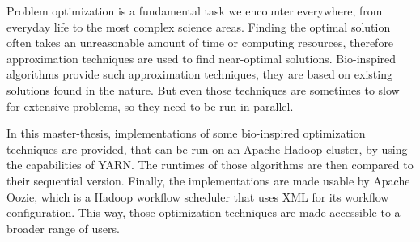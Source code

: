 Problem optimization is a fundamental task we encounter everywhere, from everyday life to the most complex science areas. Finding the optimal solution often takes an unreasonable amount of time or computing resources, therefore approximation techniques are used to find near-optimal solutions. Bio-inspired algorithms provide such approximation techniques, they are based on existing solutions found in the nature. But even those techniques are sometimes to slow for extensive problems, so they need to be run in parallel.

In this master-thesis, implementations of some bio-inspired optimization techniques are provided, that can be run on an Apache Hadoop cluster, by using the capabilities of YARN. The runtimes of those algorithms are then compared to their sequential version. Finally, the implementations are made usable by Apache Oozie, which is a Hadoop workflow scheduler that uses XML for its workflow configuration. This way, those optimization techniques are made accessible to a broader range of users.